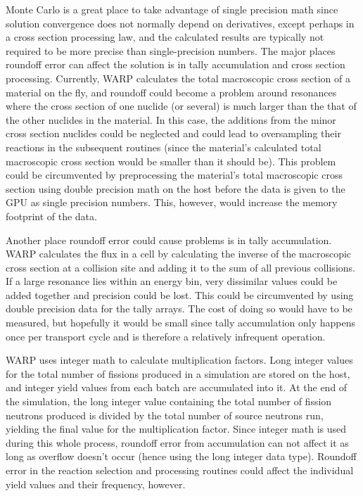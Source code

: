 \documentclass[preprint,12pt]{elsarticle}
\begin{document}
Monte Carlo is a great place to take advantage of single precision math since solution convergence does not normally depend on derivatives, except perhaps in a cross section processing law, and the calculated results are typically not required to be more precise than single-precision numbers.  The major places roundoff error can affect the solution is in tally accumulation and cross section processing.  Currently, WARP calculates the total macroscopic cross section of a material on the fly, and roundoff could become a problem around resonances where the cross section of one nuclide (or several) is much larger than the that of the other nuclides in the material.  In this case, the additions from the minor cross section nuclides could be neglected and could lead to oversampling their reactions in the subsequent routines (since the material's calculated total macroscopic cross section would be smaller than it should be).  This problem could be circumvented by preprocessing the material's total macroscopic cross section using double precision math on the host before the data is given to the GPU as single precision numbers.  This, however, would increase the memory footprint of the data.

Another place roundoff error could cause problems is in tally accumulation.  WARP calculates the flux in a cell by calculating the inverse of the macroscopic cross section at a collision site and adding it to the sum of all previous collisions.  If a large resonance lies within an energy bin, very dissimilar values could be added together and precision could be lost.  This could be circumvented by using double precision data for the tally arrays.  The cost of doing so would have to be measured, but hopefully it would be small since tally accumulation only happens once per transport cycle and is therefore a relatively infrequent operation.

WARP uses integer math to calculate multiplication factors.  Long integer values for the total number of fissions produced in a simulation are stored on the host, and integer yield values from each batch are accumulated into it.  At the end of the simulation, the long integer value containing the total number of fission neutrons produced is divided by the total number of source neutrons run, yielding the final value for the multiplication factor. Since integer math is used during this whole process, roundoff error from accumulation can not affect it as long as overflow doesn't occur (hence using the long integer data type).  Roundoff error in the reaction selection and processing routines could affect the individual yield values and their frequency, however.
\end{document}
